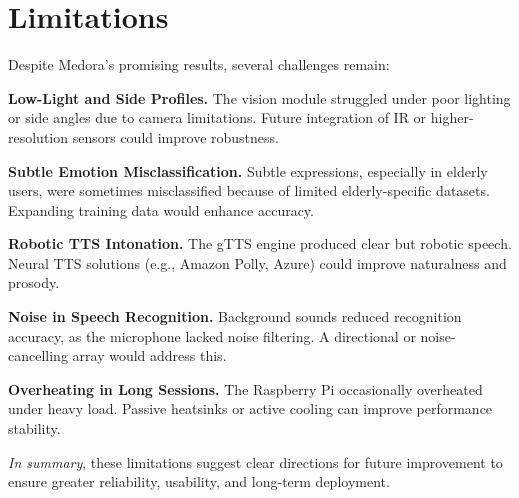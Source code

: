 \section{Limitations}

Despite Medora’s promising results, several challenges remain:

\textbf{Low-Light and Side Profiles.}  
The vision module struggled under poor lighting or side angles due to camera limitations. Future integration of IR or higher-resolution sensors could improve robustness.

\textbf{Subtle Emotion Misclassification.}  
Subtle expressions, especially in elderly users, were sometimes misclassified because of limited elderly-specific datasets. Expanding training data would enhance accuracy.

\textbf{Robotic TTS Intonation.}  
The gTTS engine produced clear but robotic speech. Neural TTS solutions (e.g., Amazon Polly, Azure) could improve naturalness and prosody.

\textbf{Noise in Speech Recognition.}  
Background sounds reduced recognition accuracy, as the microphone lacked noise filtering. A directional or noise-cancelling array would address this.

\textbf{Overheating in Long Sessions.}  
The Raspberry Pi occasionally overheated under heavy load. Passive heatsinks or active cooling can improve performance stability.

\textit{In summary}, these limitations suggest clear directions for future improvement to ensure greater reliability, usability, and long-term deployment.



















